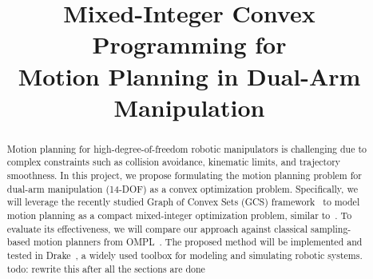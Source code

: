 \documentclass[conference]{IEEEtran}
\begin{document}
\title{Mixed-Integer Convex Programming for \\Motion Planning in Dual-Arm Manipulation}

\author{
}

\maketitle

\begin{abstract}
Motion planning for high-degree-of-freedom robotic manipulators is challenging due to complex constraints such as collision avoidance, kinematic limits, and trajectory smoothness.
%
In this project, we propose formulating the motion planning problem for dual-arm manipulation (14-DOF) as a convex optimization problem.
%
Specifically, we will leverage the recently studied Graph of Convex Sets (GCS) framework~\cite{marcucci2024shortest} to model motion planning as a compact mixed-integer optimization problem, similar to~\cite{marcucci2023motion}.
%
To evaluate its effectiveness, we will compare our approach against classical sampling-based motion planners from OMPL~\cite{sucan2012open}.
%
The proposed method will be implemented and tested in Drake~\cite{drake}, a widely used toolbox for modeling and simulating robotic systems.
{\color{red}todo: rewrite this after all the sections are done}
\end{abstract}








\end{document}
